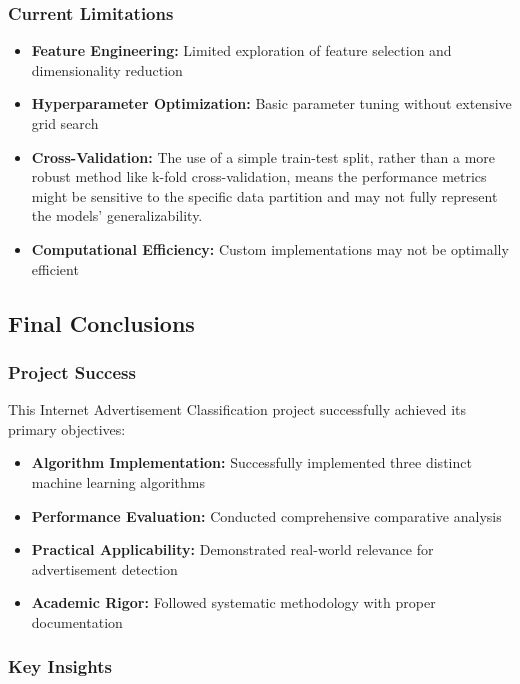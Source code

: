 \subsubsection{Current Limitations}

\begin{itemize}
    \item \textbf{Feature Engineering:} Limited exploration of feature selection and dimensionality reduction
    \item \textbf{Hyperparameter Optimization:} Basic parameter tuning without extensive grid search
    \item \textbf{Cross-Validation:} The use of a simple train-test split, rather than a more robust method like k-fold cross-validation, means the performance metrics might be sensitive to the specific data partition and may not fully represent the models' generalizability.
    \item \textbf{Computational Efficiency:} Custom implementations may not be optimally efficient
\end{itemize}



\subsection{Final Conclusions}

\subsubsection{Project Success}

This Internet Advertisement Classification project successfully achieved its primary objectives:

\begin{itemize}
    \item \textbf{Algorithm Implementation:} Successfully implemented three distinct machine learning algorithms
    \item \textbf{Performance Evaluation:} Conducted comprehensive comparative analysis
    \item \textbf{Practical Applicability:} Demonstrated real-world relevance for advertisement detection
    \item \textbf{Academic Rigor:} Followed systematic methodology with proper documentation
\end{itemize}

\subsubsection{Key Insights}

